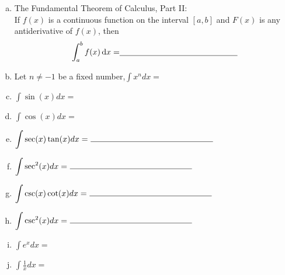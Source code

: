 \documentclass[12pt]{amsart}
\begin{document}
\begin{thm}
  \begin{enumerate}[(a)]
  \item
    The Fundamental Theorem of Calculus, Part II:\\
    If \(f(x)\) is a continuous function on the interval \([a,b]\) and \(F(x)\) is any antiderivative of \(f(x)\), then\\ 
    
    \[\displaystyle{\int_a^bf(x)\dif x= }{\underline{\hspace{2in}}}\]

    \vspace{.5in}

  \item
    Let \(n\neq -1\) be a fixed number,\(\displaystyle{\int x^ndx=}\){\underline{\hspace{2in}}}

    \vspace{.25in}

  \item
    \(\displaystyle{\int \sin(x)dx=}\){\underline{\hspace{2in}}} 

    \vspace{.25in}

  \item
    \(\displaystyle{\int \cos(x)dx=}\){\underline{\hspace{2in}}} 

    \vspace{.25in}

  \item
    \(\displaystyle{\int \sec(x)\tan(x)dx=\ \line(1,0){150}}\)

    \vspace{.25in}

  \item
    \(\displaystyle{\int\sec^2(x)dx=\ \line(1,0){150}}\)

    \vspace{.25in}

  \item
    \(\displaystyle{\int\csc(x)\cot(x)dx=\ \line(1,0){150}}\)

    \vspace{.25in}

  \item
    \(\displaystyle{\int\csc^2(x)dx=\ \line(1,0){150}}\)

    \vspace{.25in}

  \item \(\displaystyle{\int e^xdx=}\){\underline{\hspace{2in}}} 

    \vspace{.25in}

  \item \(\displaystyle{\int\frac{1}{x}dx=}\){\underline{\hspace{2in}}} 
  \end{enumerate}
\end{thm}
\end{document}
